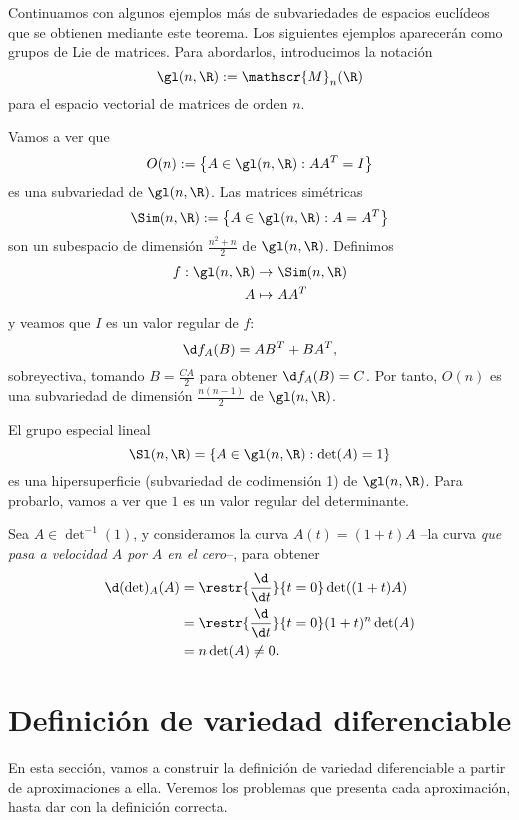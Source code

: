 Continuamos con algunos ejemplos más de subvariedades de espacios euclídeos que
se obtienen mediante este teorema. Los siguientes ejemplos aparecerán como
grupos de Lie de matrices. Para abordarlos, introducimos la notación
  \[
    \gl(n,\R) := \mathscr{M}_{n}(\R)
  \]
  para el espacio vectorial de matrices de orden $n$.
\begin{ejemplo}
  Vamos a ver que
  \[
    O(n) := \left\{ A\in\gl(n,\R) : AA^{T} = I \right\}
  \]
  es una subvariedad de $\gl(n,\R)$. Las matrices simétricas
  \[
    \Sim(n,\R) := \left\{ A\in\gl(n,\R) : A = A^{T} \right\}
  \]
  son un subespacio de dimensión $\frac{n^{2}+n}{2}$ de $\gl(n,\R)$.
  Definimos
\begin{alignat*}{2}
    f: \gl(n,\R) & \to \Sim(n,\R) \\
    A & \mapsto AA^{T}
\end{alignat*}
y veamos que $I$ es un valor regular de $f$:
\[
  \d f_{A}(B) = AB^{T} + BA^{T}
,\]
sobreyectiva, tomando $B = \frac{CA}{2}$ para obtener $\d f_{A}(B) = C$. Por
tanto, $O(n)$ es una subvariedad de dimensión $\frac{n(n-1)}{2}$ de $\gl(n,\R)$.
\end{ejemplo}

\begin{ejemplo}
  El grupo especial lineal
  \[
    \Sl(n,\R) = \left\{ A\in \gl(n,\R) : \det(A) = 1 \right\}
  \]
  es una hipersuperficie (subvariedad de codimensión 1) de $\gl(n,\R)$. Para
  probarlo, vamos a ver que $1$ es un valor regular del determinante.

  Sea $A\in\det^{-1}(1)$, y consideramos la curva $A(t) = (1+t)A$ --la curva
  \emph{que pasa a velocidad $A$ por $A$ en el cero}--, para obtener
  \begin{align*}
    \d (\det)_{A}(A) &= \restr{\frac{\d}{\d t}}{t = 0} \det((1+t)A)\\
                   &= \restr{\frac{\d}{\d t}}{t = 0}(1+t)^{n}\det(A)\\
    &= n\det(A) \ne 0.
  \end{align*}
\end{ejemplo}

\section{Definición de variedad diferenciable}

En esta sección, vamos a construir la definición de variedad diferenciable a
partir de aproximaciones a ella. Veremos los problemas que presenta cada
aproximación, hasta dar con la definición correcta.

